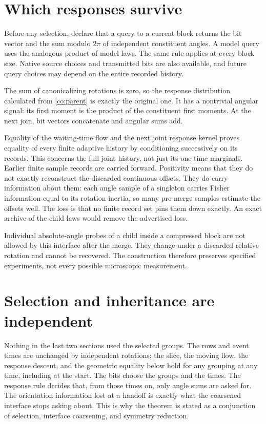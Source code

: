 \section{Which responses survive}

Before any selection, declare that a query to a current block returns the bit vector and the sum modulo $2\pi$ of independent constituent angles. A model query uses the analogous product of model laws. The same rule applies at every block size. Native source choices and transmitted bits are also available, and future query choices may depend on the entire recorded history.

The sum of canonicalizing rotations is zero, so the response distribution calculated from \cref{co:parent} is exactly the original one. It has a nontrivial angular signal: its first moment is the product of the constituent first moments. At the next join, bit vectors concatenate and angular sums add.

Equality of the waiting-time flow and the next joint response kernel proves equality of every finite adaptive history by conditioning successively on its records. This concerns the full joint history, not just its one-time marginals. Earlier finite sample records are carried forward. Positivity means that they do not exactly reconstruct the discarded continuous offsets. They do carry information about them: each angle sample of a singleton carries Fisher information equal to its rotation inertia, so many pre-merge samples estimate the offsets well. The loss is that no finite record set pins them down exactly. An exact archive of the child laws would remove the advertised loss.

Individual absolute-angle probes of a child inside a compressed block are not allowed by this interface after the merge. They change under a discarded relative rotation and cannot be recovered. The construction therefore preserves specified experiments, not every possible microscopic measurement.

\section{Selection and inheritance are independent}

Nothing in the last two sections used the selected groups. The rows and event times are unchanged by independent rotations; the slice, the moving flow, the response descent, and the geometric equality below hold for any grouping at any time, including at the start. The bits choose the groups and the times. The response rule decides that, from those times on, only angle sums are asked for. The orientation information lost at a handoff is exactly what the coarsened interface stops asking about. This is why the theorem is stated as a conjunction of selection, interface coarsening, and symmetry reduction.

